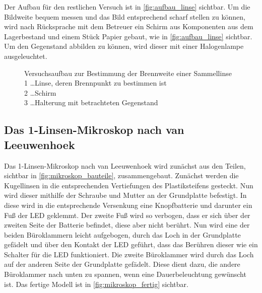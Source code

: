 \documentclass[12pt,english,ngerman]{scrartcl}
\begin{document}
Der Aufbau für den restlichen Versuch ist in \autoref{fig:aufbau_linse}
sichtbar. Um die Bildweite bequem messen und das Bild entsprechend scharf
stellen zu können, wird nach Rücksprache mit dem Betreuer ein Schirm aus
Komponenten aus dem Lagerbestand und einem Stück Papier gebaut, wie in
\autoref{fig:aufbau_linse} sichtbar. Um den Gegenstand abbilden zu können, wird
dieser mit einer Halogenlampe ausgeleuchtet.

\begin{figure}[H]
	\begin{center}
	\end{center}
	\caption[Versuchsaufbau zur Bestimmung der Brennweite einer Sammellinse] {
		Versuchsaufbau zur Bestimmung der Brennweite einer Sammellinse \\
		1 \dots Linse, deren Brennpunkt zu bestimmen ist               \\
		2 \dots Schirm                                                 \\
		3 \dots Halterung mit betrachteten Gegenstand
	}\label{fig:aufbau_linse}
\end{figure}

\subsection{Das 1-Linsen-Mikroskop nach van Leeuwenhoek}

Das 1-Linsen-Mikroskop nach van Leeuwenhoek wird zunächst aus den Teilen,
sichtbar in \autoref{fig:mikroskop_bauteile}, zusammengebaut. Zunächst werden
die Kugellinsen in die entsprechenden Vertiefungen des Plastiksteifens
gesteckt. Nun wird dieser mithilfe der Schraube und Mutter an der Grundplatte
befestigt. In diese wird in die entsprechende Versenkung eine Knopfbatterie und
darunter ein Fuß der LED geklemmt. Der zweite Fuß wird so verbogen, dass er
sich über der zweiten Seite der Batterie befindet, diese aber nicht berührt.
Nun wird eine der beiden Büroklammern leicht aufgebogen, durch das Loch in der
Grundplatte gefädelt und über den Kontakt der LED geführt, dass das Berühren
dieser wie ein Schalter für die LED funktioniert. Die zweite Büroklammer wird
durch das Loch auf der anderen Seite der Grundplatte gefädelt. Diese dient
dazu, die andere Büroklammer nach unten zu spannen, wenn eine Dauerbeleuchtung
gewünscht ist. Das fertige Modell ist in \autoref{fig:mikroskop_fertig}
sichtbar.
\end{document}
